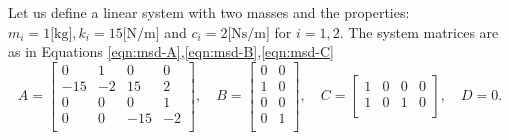 \begin{example}\label{ex:system}
    Let us define a linear system with two masses and the properties: $m_i=1 \text{[kg]}, k_i=15\text{[N/m]}$ and $c_i=2 \text{[Ns/m]}$ for $i=1,2$. The system matrices are as in Equations \eqref{eqn:msd-A},\eqref{eqn:msd-B},\eqref{eqn:msd-C}
    \begin{equation}\label{eqn:example-system}
    A =
    \begin{bmatrix}
        0 & 1 & 0 & 0 \\
        -15 & -2 & 15 & 2 \\
        0 & 0 & 0 & 1 \\
        0 & 0 & -15 & -2 \\
    \end{bmatrix}, \quad
    B = 
    \begin{bmatrix}
        0 & 0 \\
        1 & 0 \\
        0 & 0 \\
        0 & 1 \\
    \end{bmatrix}, \quad
    C =
    \begin{bmatrix}
        1 & 0 & 0 & 0 \\
        1 & 0 & 1 & 0 \\
    \end{bmatrix}, \quad
    D = 0.
    \end{equation}
\end{example}